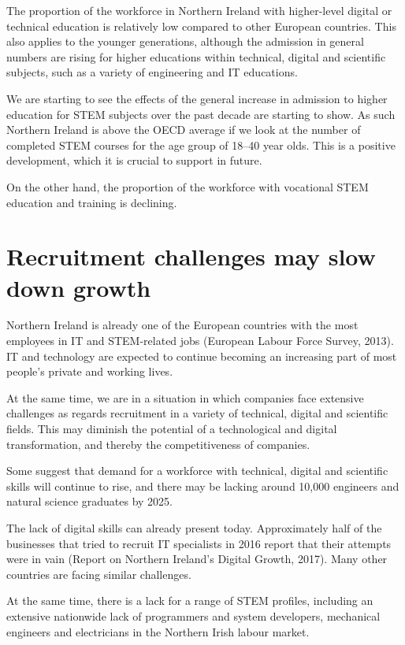 The proportion of the workforce in Northern Ireland with higher-level digital or technical education is relatively low compared to other European countries. This also applies to the younger generations, although the admission in general numbers are rising for higher educations within technical, digital and scientific subjects, such as a variety of engineering and IT educations.

We are starting to see the effects of the general increase in admission to higher education for STEM subjects over the past decade are starting to show. As such Northern Ireland is above the OECD average if we look at the number of completed STEM courses for the age group of 18--40 year olds. This is a positive development, which it is crucial to support in future.

On the other hand, the proportion of the workforce with vocational STEM education and training is declining.

\section{Recruitment challenges may slow down growth}

Northern Ireland is already one of the European countries with the most employees in IT and STEM-related jobs (European Labour Force Survey, 2013). IT and technology are expected to continue becoming an increasing part of most people's private and working lives. 

At the same time, we are in a situation in which companies face extensive challenges as regards recruitment in a variety of technical, digital and scientific fields. This may diminish the potential of a technological and digital transformation, and thereby the competitiveness of companies.

Some suggest that demand for a workforce with technical, digital and scientific skills will continue to rise, and there may be lacking around 10,000 engineers and natural science graduates by 2025.

The lack of digital skills can already present today. Approximately half of the businesses that tried to recruit IT specialists in 2016 report that their attempts were in vain (Report on Northern Ireland's Digital Growth, 2017). Many other countries are facing similar challenges.

At the same time, there is a lack for a range of STEM profiles, including an extensive nationwide lack of programmers and system developers, mechanical engineers and electricians in the Northern Irish labour market.

